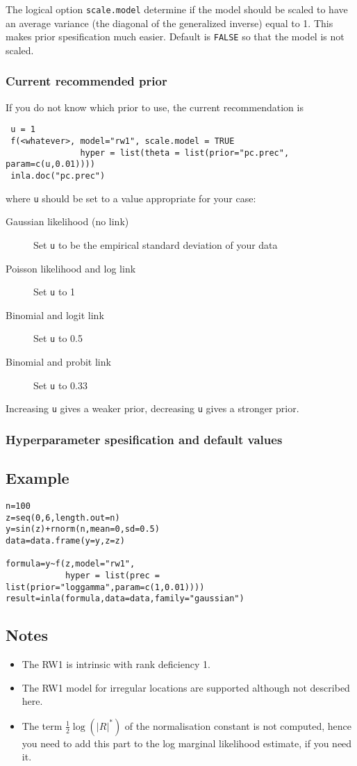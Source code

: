 \documentclass[a4paper,11pt]{article}
\begin{document}
The logical option \verb|scale.model| determine if the model should be
scaled to have an average variance (the diagonal of the generalized
inverse) equal to 1. This makes prior spesification much
easier. Default is \verb|FALSE| so that the model is not scaled.

\subsubsection*{Current recommended prior}
If you do not know which prior to use, the current recommendation is
\begin{verbatim}
 u = 1
 f(<whatever>, model="rw1", scale.model = TRUE
               hyper = list(theta = list(prior="pc.prec", param=c(u,0.01))))
 inla.doc("pc.prec")
\end{verbatim}
where {\tt u} should be set to a value appropriate for your case:
\begin{description}
\item[Gaussian likelihood (no link)] Set {\tt u} to be the empirical standard deviation of your data
\item[Poisson likelihood and log link] Set {\tt u} to 1
\item[Binomial and logit link] Set {\tt u} to 0.5
\item[Binomial and probit link] Set {\tt u} to 0.33
\end{description}
Increasing {\tt u} gives a weaker prior, decreasing {\tt u} gives a stronger prior.

\subsubsection*{Hyperparameter spesification and default values}



\subsection*{Example}

\begin{verbatim}
n=100
z=seq(0,6,length.out=n)
y=sin(z)+rnorm(n,mean=0,sd=0.5)
data=data.frame(y=y,z=z)

formula=y~f(z,model="rw1",
            hyper = list(prec = list(prior="loggamma",param=c(1,0.01))))
result=inla(formula,data=data,family="gaussian")
\end{verbatim}


\subsection*{Notes}

\begin{itemize}
\item The RW1 is intrinsic with rank deficiency 1.
\item The RW1 model for irregular locations are supported although not
    described here.
\item The term $\frac{1}{2}\log(|R|^{*})$ of the normalisation
    constant is not computed, hence you need to add this part to the
    log marginal likelihood estimate, if you need it.
\end{itemize}
\end{document}
